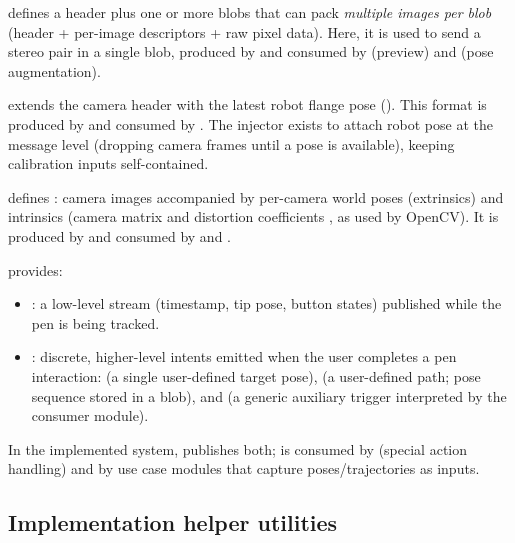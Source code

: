  defines a  header plus one or more blobs that can pack \emph{multiple images per blob} (header + per-image descriptors + raw pixel data). Here, it is used to send a stereo pair in a single blob, produced by  and consumed by  (preview) and  (pose augmentation).

 extends the camera header with the latest robot flange pose (). This format is produced by  and consumed by . The injector exists to attach robot pose at the message level (dropping camera frames until a pose is available), keeping calibration inputs self-contained.

 defines : camera images accompanied by per-camera world poses (extrinsics) and intrinsics (camera matrix  and distortion coefficients , as used by OpenCV). It is produced by  and consumed by  and .

 provides:
\begin{itemize}
    \item {}: a low-level stream (timestamp, tip pose, button states) published while the pen is being tracked.
    \item {}: discrete, higher-level intents emitted when the user completes a pen interaction:  (a single user-defined target pose),  (a user-defined path; pose sequence stored in a blob), and  (a generic auxiliary trigger interpreted by the consumer module).
\end{itemize}
In the implemented system,  publishes both;  is consumed by  (special action handling) and by use case modules that capture poses/trajectories as  inputs.


\subsection{Implementation helper utilities} \label{sec:ch3_shared_helper_utilities}


